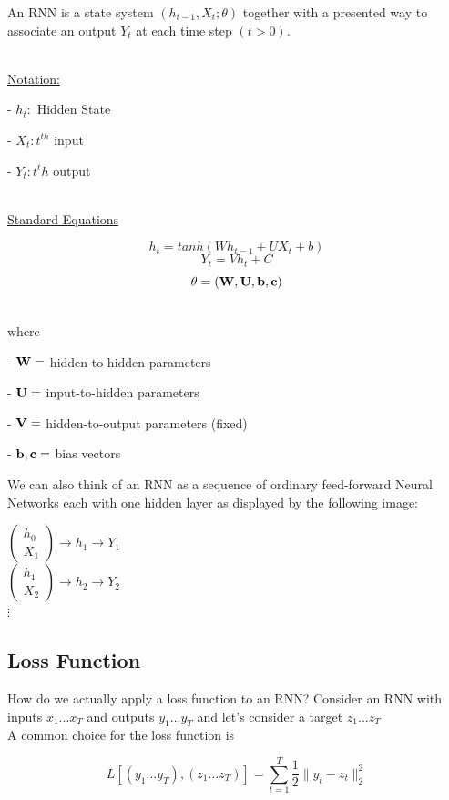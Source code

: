 An RNN is a state system $(h_{t-1}, X_t; \theta)$ together with a presented way to associate an output $Y_t$ at each time step $(t>0)$.

~\\\underline{Notation:}

- $h_t:$ Hidden State

- $X_t: t^{th}$ input 

- $Y_t: t^th$ output

~\\\underline{Standard Equations}

$$h_t = tanh(Wh_{t-1} + UX_{t} + b)$$
$$Y_t = Vh_t + C$$
$$\theta = (\MW, \MU, \vb,\vc)$$

~\\ where

- $\MW=$ hidden-to-hidden parameters

- $\MU=$ input-to-hidden parameters

- $ \MV=$ hidden-to-output parameters (fixed)

- $\vb,\vc =$ bias vectors

\noindent We can also think of an RNN as a sequence of ordinary feed-forward Neural Networks each with one hidden layer as displayed by the following image:

\begin{center}
$\begin{pmatrix}
 h_0\\
 X_1
\end{pmatrix} \longrightarrow	h_1 \longrightarrow	Y_1$\\
$\begin{pmatrix}
 h_1\\
 X_2
\end{pmatrix} \longrightarrow	h_2 \longrightarrow	Y_2$\\
  $\vdots$
\end{center}
\subsection{Loss Function}
How do we actually apply a loss function to an RNN? Consider an RNN with inputs $x_{1}...x_{T}$ and outputs $y_{1}...y_{T}$ and let's consider a target $z_{1}...z_{T}$ \\

A common choice for the loss function is 

$$ L \left[ \left( y_{1}...y_{T} \right), \left( z_{1}...z_{T} \right) \right] = \sum_{t=1}^{T} \frac{1}{2} \lVert y_{t} - z_{t} \rVert_{2}^2 $$

